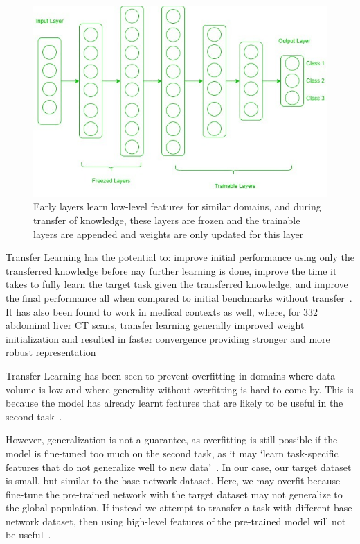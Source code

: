 \documentclass[12pt,twoside]{report}
\begin{document}
\begin{figure}[H]
  \centering
  \includegraphics[width=0.7\linewidth]{../figures/Frozen-layers.jpg}
  \caption{Early layers learn low-level features for similar domains, and during transfer of knowledge, these layers are frozen and the trainable layers are appended and weights are only updated for this layer~\cite{geeks-transfer-learning}}
 \label{fig:frozen-layers}
\end{figure}

Transfer Learning has the potential to: improve initial performance using only the transferred knowledge before nay further learning is done, improve the time it takes to fully learn the target task given the transferred knowledge, and improve the final performance all when compared to initial benchmarks without transfer~\cite{torrey-handbook}. It has also been found to work in medical contexts as well, where, for 332 abdominal liver CT scans, transfer learning generally improved weight initialization and resulted in faster convergence providing stronger and more robust representation~\cite{liver-lesion-via-transfer-learning}

Transfer Learning has been seen to prevent overfitting in domains where data volume is low and where generality without overfitting is hard to come by. This is because the model has already learnt features that are likely to be useful in the second task~\cite{geeks-transfer-learning}. 

However, generalization is not a guarantee, as overfitting is still possible if the model is fine-tuned too much on the second task, as it may `learn task-specific features that do not generalize well to new data'~\cite{geeks-transfer-learning}. In our case, our target dataset is small, but similar to the base network dataset. Here, we may overfit because fine-tune the pre-trained network with the target dataset may not generalize to the global population. If instead we attempt to transfer a task with different base network dataset, then using high-level features of the pre-trained model will not be useful~\cite{geeks-transfer-learning}.
\end{document}
